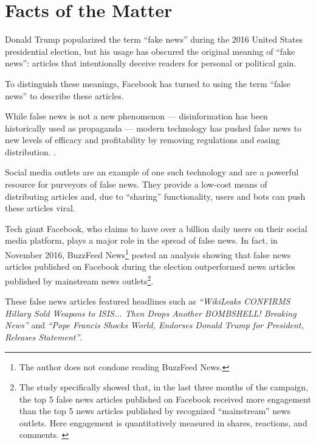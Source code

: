 

\section{Facts of the Matter}

\par Donald Trump popularized the term ``fake news'' during the 2016 United States presidential election, \cite{telegraph_fake_news} but his usage has obscured the original meaning of ``fake news'': articles that intentionally deceive readers for personal or political gain. \cite{npr_fake_news}

\par To distinguish these meanings, Facebook has turned to using the term ``false news'' to describe these articles. \cite{guardian_fb_tips}

\par While false news is not a new phenomenon --- disinformation has been historically used as propaganda \cite{bbc_fn_propaganda} --- modern technology has pushed false news to new levels of efficacy and profitability by removing regulations and easing distribution. \cite{telegraph_fake_news}.

\par Social media outlets are an example of one such technology and are a powerful resource for purveyors of false news. They provide a low-cost means of distributing articles and, due to ``sharing'' functionality, users and bots can push these articles viral. \cite{cbs_fake_news}

\par Tech giant Facebook, who claims to have over a billion daily users on their social media platform, plays a major role in the spread of false news. \cite{cbs_fake_news} In fact, in November 2016, BuzzFeed News\footnote{The author does not condone reading BuzzFeed News.} posted an analysis showing that false news articles published on Facebook during the election outperformed news articles published by mainstream news outlets\footnote{The study specifically showed that, in the last three months of the campaign, the top 5 false news articles published on Facebook received more engagement than the top 5 news articles published by recognized ``mainstream'' news outlets. Here engagement is quantitatively measured in shares, reactions, and comments. \cite{buzzfeed_news_analysis}}. \cite{buzzfeed_news_analysis}

\par These false news articles featured headlines such as
\emph{``WikiLeaks CONFIRMS Hillary Sold Weapons to ISIS... Then Drops Another BOMBSHELL! Breaking News''} and
\emph{``Pope Francis Shocks World, Endorses Donald Trump for President, Releases Statement''}. \cite{buzzfeed_news_analysis}


